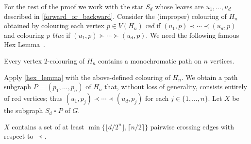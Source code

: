 \documentclass[kpfonts]{patmorin}
\newcommand{\CartProd}{\mathbin{\square}}
\begin{document}
For the rest of the proof we work with the star $S_d$ whose leaves are $u_1,\ldots,u_d$ described in \cref{forward_or_backward}.  Consider the (improper) colouring of $H_n$ obtained by colouring each vertex $p\in V(H_n)$ \emph{red} if $(u_1,p)\prec\cdots\prec (u_d,p)$ and colouring $p$ \emph{blue} if $(u_1,p)\succ\cdots\succ(u_d,p)$. We need the following famous Hex Lemma~\citep{Gale79}.

\begin{lem} \label{hex_lemma}
Every vertex 2-colouring of $H_n$ contains a monochromatic path on $n$ vertices.
\end{lem}


Apply \cref{hex_lemma} with the above-defined colouring of $H_n$. We obtain a path subgraph  $P=(p_1,\ldots,p_n)$ of $H_n$ that, without loss of generality, consists entirely of red vertices; thus $(u_1,p_j)\prec\cdots\prec (u_d,p_j)$ for each $j\in\{1,\ldots,n\}$.  Let $X$ be the subgraph $S_d \CartProd P$ of $G$.

\begin{lem}\label{twister}
$X$ contains a set of at least $\min\{\lfloor d/2^{n}\rfloor,\lceil n/2\rceil\}$ pairwise crossing edges with respect to $\prec$.
\end{lem}
\end{document}
